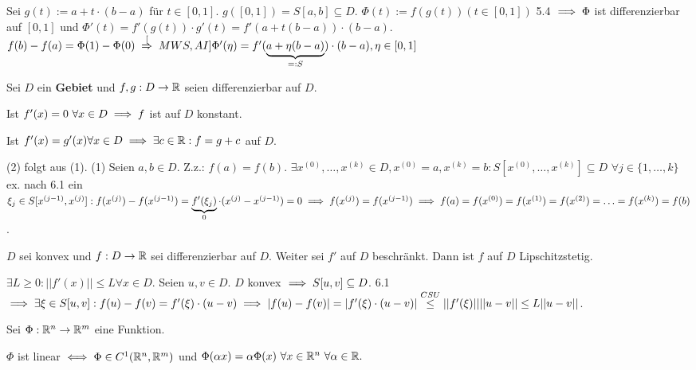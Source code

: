 \documentclass[a4paper,twoside,DIV15,BCOR12mm,chapterprefix=true,headings=twolinechapter]{scrbook}
\begin{document}
\begin{beweis}
Sei $g(t):=a+t\cdot(b-a)$ für $t\in[0,1]$. $g([0,1])=S[a,b]\subseteq D$. $\Phi(t):=f(g(t)) (t \in [0,1])$ 5.4 $\implies \Phi$ ist differenzierbar auf $[0,1]$ und $\Phi'(t) = f'(g(t))\cdot g'(t) = f'(a+t(b-a))\cdot(b-a)$. $f(b)-f(a)=\Phi(1)-\Phi(0) \folgtnach[MWS, AI] \Phi'(\eta) = f'(\underbrace{a+\eta(b-a)}_{=:S})\cdot(b-a), \eta \in [0,1]$
\end{beweis}

\begin{folgerungen}
Sei $D$ ein \textbf{Gebiet} und $f,g:D\to\mathbb{R}$ seien differenzierbar auf $D$.
\begin{liste}
\item Ist $f'(x)=0\ \forall x \in D \implies f$ ist auf $D$ konstant.
\item Ist $f'(x)=g'(x) \forall x \in D \implies \exists c \in \mathbb{R}: f=g+c$ auf $D$.
\end{liste}
\end{folgerungen}

\begin{beweis}
(2) folgt aus (1). (1) Seien $a,b \in D$. Z.z.: $f(a)=f(b)$.
$\exists x^{(0)},\ldots,x^{(k)} \in D, x^{(0)}=a, x^{(k)}=b: S[x^{(0)},\ldots,x^{(k)}] \subseteq D$
$\forall j \in \{1,\ldots,k\}$ ex. nach 6.1 ein $\xi_j \in S[x^{(j-1)}, x^{(j)}]:
f(x^{(j)})-f(x^{(j-1)}) = \underbrace{f'(\xi_j)}_0\cdot(x^{(j)}-x^{(j-1)})=0
\implies f(x^{(j)}) = f(x^{(j-1)}) \implies f(a)=f(x^{(0)})=f(x^{(1)})=f(x^{(2)})=\ldots = f(x^{(k)}) = f(b)$.
\end{beweis}

\begin{satz}
$D$ sei konvex und $f:D\to\mathbb{R}$ sei differenzierbar auf $D$. Weiter sei $f'$ auf $D$ beschränkt. Dann ist $f$ auf $D$ Lipschitzstetig.
\end{satz}

\begin{beweis}
$\exists L \ge 0: ||f'(x)|| \le L \forall x \in D$. Seien $u,v \in D$. $D$ konvex $\implies S[u,v]\subseteq D$. 6.1 $\implies \exists\xi\in S[u,v]:f(u)-f(v)=f'(\xi)\cdot(u-v) \implies |f(u)-f(v)|=|f'(\xi)\cdot(u-v)|\stackrel{CSU}{\le}||f'(\xi)|| ||u-v|| \le L||u-v||$.
\end{beweis}

\begin{satz}[Linearität]
Sei $\Phi:\mathbb{R}^n\to\mathbb{R}^m$ eine Funktion.

$\Phi$ ist linear $\iff \Phi \in C^1(\mathbb{R}^n, \mathbb{R}^m)$ und $\Phi(\alpha x)=\alpha\Phi(x)\ \forall x \in \mathbb{R}^n\ \forall \alpha \in \mathbb{R}.$
\end{satz}
\end{document}
